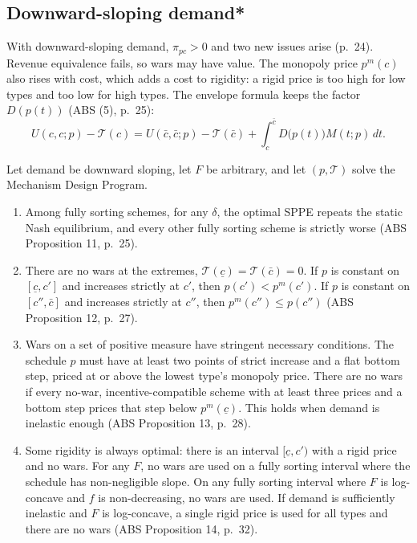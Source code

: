 \subsection{Downward-sloping demand*}\label{sec:12-abs-downward}

With downward-sloping demand, $\pi_{pc} > 0$ and two new issues arise (p.~24). Revenue equivalence fails, so wars may
have value. The monopoly price $p^m(c)$ also rises with cost, which adds a cost to rigidity: a rigid price is too
high for low types and too low for high types. The envelope formula keeps the factor $D(p(t))$ (ABS (5), p.~25):
\begin{equation}\label{eq:12-abs-env-elastic}
U(c, c; p) - \mathcal T(c) = U(\bar c, \bar c; p) - \mathcal T(\bar c) + \int_c^{\bar c}D\bigl(p(t)\bigr)M(t; p)\,dt .
\end{equation}

\begin{proposition}\label{prop:12-abs-downward}
Let demand be downward sloping, let $F$ be arbitrary, and let $(p, \mathcal T)$ solve the Mechanism Design Program.
\begin{enumerate}[label=(\roman*)]
\item Among fully sorting schemes, for any $\delta$, the optimal SPPE repeats the static Nash equilibrium, and every
other fully sorting scheme is strictly worse (ABS Proposition 11, p.~25).
\item There are no wars at the extremes, $\mathcal T(\underline c) = \mathcal T(\bar c) = 0$. If $p$ is constant on
$[\underline c, c']$ and increases strictly at $c'$, then $p(c') < p^m(c')$. If $p$ is constant on $[c'', \bar c]$ and
increases strictly at $c''$, then $p^m(c'') \le p(c'')$ (ABS Proposition 12, p.~27).
\item Wars on a set of positive measure have stringent necessary conditions. The schedule $p$ must have at least two
points of strict increase and a flat bottom step, priced at or above the lowest type's monopoly price. There are no
wars if every no-war, incentive-compatible scheme with at least three prices and a bottom step prices that step below
$p^m(\underline c)$. This holds when demand is inelastic enough (ABS Proposition 13, p.~28).
\item Some rigidity is always optimal: there is an interval $[\underline c, c')$ with a rigid price and no wars. For any
$F$, no wars are used on a fully sorting interval where the schedule has non-negligible slope. On any fully sorting
interval where $F$ is log-concave and $f$ is non-decreasing, no wars are used. If demand is
sufficiently inelastic and $F$ is log-concave, a single rigid price is used for all types and there are no wars (ABS
Proposition 14, p.~32).
\end{enumerate}
\end{proposition}


